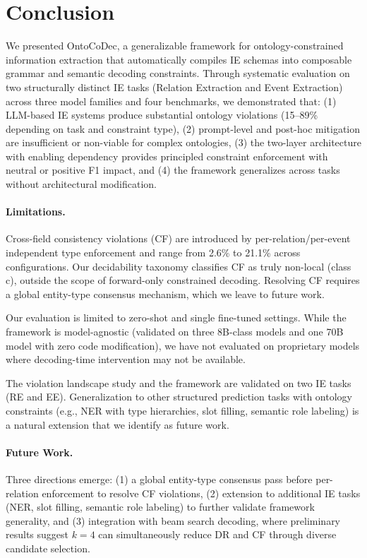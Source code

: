 \documentclass[11pt,a4paper]{article}
\newcommand{\sys}{OntoCoDec}
\begin{document}
\section{Conclusion}
\label{sec:conclusion}

We presented \sys{}, a generalizable framework for ontology-constrained information extraction that automatically compiles IE schemas into composable grammar and semantic decoding constraints. Through systematic evaluation on two structurally distinct IE tasks (Relation Extraction and Event Extraction) across three model families and four benchmarks, we demonstrated that: (1) LLM-based IE systems produce substantial ontology violations (15--89\% depending on task and constraint type), (2) prompt-level and post-hoc mitigation are insufficient or non-viable for complex ontologies, (3) the two-layer architecture with enabling dependency provides principled constraint enforcement with neutral or positive F1 impact, and (4) the framework generalizes across tasks without architectural modification.

\paragraph{Limitations.}
Cross-field consistency violations (CF) are introduced by per-relation/per-event independent type enforcement and range from 2.6\% to 21.1\% across configurations. Our decidability taxonomy classifies CF as truly non-local (class c), outside the scope of forward-only constrained decoding. Resolving CF requires a global entity-type consensus mechanism, which we leave to future work.

Our evaluation is limited to zero-shot and single fine-tuned settings. While the framework is model-agnostic (validated on three 8B-class models and one 70B model with zero code modification), we have not evaluated on proprietary models where decoding-time intervention may not be available.

The violation landscape study and the framework are validated on two IE tasks (RE and EE). Generalization to other structured prediction tasks with ontology constraints (e.g., NER with type hierarchies, slot filling, semantic role labeling) is a natural extension that we identify as future work.

\paragraph{Future Work.}
Three directions emerge: (1) a global entity-type consensus pass before per-relation enforcement to resolve CF violations, (2) extension to additional IE tasks (NER, slot filling, semantic role labeling) to further validate framework generality, and (3) integration with beam search decoding, where preliminary results suggest $k=4$ can simultaneously reduce DR and CF through diverse candidate selection.
\end{document}
